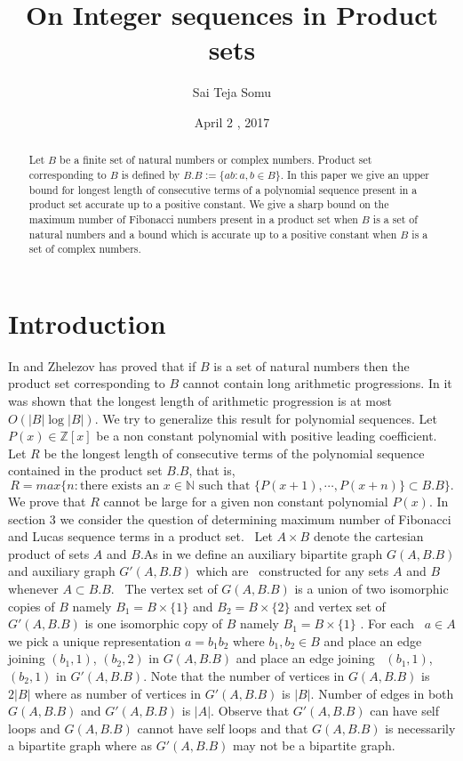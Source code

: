 \documentclass{amsart}
\newtheorem{Lemma 1}{Lemma}[section]
\newtheorem{Lemma 3}[Lemma 1]{Lemma}
\newtheorem{Lucas The}[Lemma 1]{Theorem}
\newtheorem{lem 1}[Lemma 1]{Lemma}
\newtheorem{Corollary 1}[Lemma 1]{Corollary}
\newtheorem{Corollary 2}[Lemma 1]{Corollary}
\begin{document}
\title{On Integer sequences in Product sets}
\address{Department of Mathematics, Indian Institute of Technology Roorkee,India 247667}
\author{Sai Teja Somu}
\date{April 2 , 2017}
\maketitle
	\begin{abstract}Let $B$ be a finite set of natural numbers or complex numbers. Product set corresponding to $B$ is defined by $B.B:=\{ab:a,b\in B\}$. In this paper we give an upper bound for longest length of consecutive terms of a polynomial sequence present in a product set accurate up to a positive constant. We give a sharp bound on the maximum number of Fibonacci numbers present in a product set when $B$ is a set of natural numbers and a bound which is accurate up to a positive constant when $B$ is a set of complex numbers. 
	\end{abstract}
	\section{Introduction}
	In \cite{A} and \cite{B} Zhelezov has proved that if $B$ is a set of natural numbers then the product set corresponding to $B$ cannot contain long arithmetic progressions. In \cite{A} it was shown that the longest length of arithmetic progression is at most $O(|B|\log |B|)$. We try to generalize this result for polynomial sequences. Let $P(x)\in \mathbb{Z}[x]$ be a non constant polynomial with positive leading coefficient. Let $R$ be the longest length of consecutive terms of the polynomial sequence contained in the product set $B.B$, that is, \[R=max\{n : \text{there exists an $x\in \mathbb{N}$ such that }  \{P(x+1),\cdots,P(x+n)\}\subset B.B\}.\]We prove that $R$ cannot be large for a given non constant polynomial $P(x)$. In section 3 we consider the question of determining maximum number of Fibonacci and Lucas sequence terms in a product set. 
	Let $A\times B$ denote the cartesian product of sets $A$ and $B$.As in \cite{A} we define an auxiliary bipartite graph $G(A, B.B)$ and auxiliary graph $G'(A,B.B)$ which are  constructed for any sets $A$ and $B$ whenever $A\subset B.B$.  The vertex set of $G(A,B.B)$ is a union of two isomorphic copies of $B$ namely $B_1=B\times\{1\}$ and $B_2=B\times\{2\}$ and vertex set of $G'(A, B.B)$ is one isomorphic copy of $B$ namely $B_1=B\times \{1\}$ . For each  $a\in A$we pick a unique representation $a = b_1b_2$ where $b_1,b_2\in B$ and place an edge joining $(b_1,1)$, $(b_2,2)$ in $G(A,B.B)$ and place an edge joining  $(b_1,1)$, $(b_2,1)$ in $G'(A,B.B)$.
	Note that the number of vertices in $G(A,B.B)$ is $2|B|$ where as number of vertices in $G'(A,B.B)$ is $|B|$. Number of edges in both $G(A,B.B)$ and $G'(A,B.B)$ is $|A|$. Observe that $G'(A,B.B)$ can have self loops and $G(A,B.B)$ cannot have self loops and that $G(A,B.B)$ is necessarily a bipartite graph where as $G'(A,B.B)$ may not be a bipartite graph.
\end{document}

